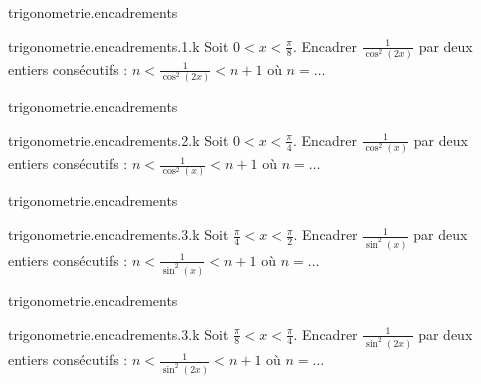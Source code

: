 \begin{qcm}{trigonometrie.encadrements}
    \begin{question}{trigonometrie.encadrements.1.k}
         Soit \(0<x<\frac{\pi}{8}\). Encadrer \(\frac{1}{\cos^2(2x)}\) par deux entiers consécutifs : 
         \( n<\frac{1}{\cos^2(2x)}<n+1\) où \(n=\ldots\)
         \vspace{-0.1cm}
         \begin{reponseshoriz}
         \end{reponseshoriz}
    \end{question}
\end{qcm}

\begin{qcm}{trigonometrie.encadrements}
    \begin{question}{trigonometrie.encadrements.2.k}
         Soit \(0<x<\frac{\pi}{4}\). Encadrer \(\frac{1}{\cos^2(x)}\) par deux entiers consécutifs : 
         \( n<\frac{1}{\cos^2(x)}<n+1\) où \(n=\ldots\)
         \vspace{-0.1cm}
         \begin{reponseshoriz}
         \end{reponseshoriz}
    \end{question}
\end{qcm}

\begin{qcm}{trigonometrie.encadrements}
    \begin{question}{trigonometrie.encadrements.3.k}
         Soit \(\frac{\pi}{4}<x<\frac{\pi}{2}\). Encadrer \(\frac{1}{\sin^2(x)}\) par deux entiers consécutifs : 
         \( n<\frac{1}{\sin^2(x)}<n+1\) où \(n=\ldots\)
         \vspace{-0.1cm}
         \begin{reponseshoriz}
         \end{reponseshoriz}
    \end{question}
\end{qcm}

\begin{qcm}{trigonometrie.encadrements}
    \begin{question}{trigonometrie.encadrements.3.k}
         Soit \(\frac{\pi}{8}<x<\frac{\pi}{4}\). Encadrer \(\frac{1}{\sin^2(2x)}\) par deux entiers consécutifs : 
         \( n<\frac{1}{\sin^2(2x)}<n+1\) où \(n=\ldots\)
         \vspace{-0.3cm}
         \begin{reponseshoriz}
         \end{reponseshoriz}
    \end{question}
\end{qcm}
